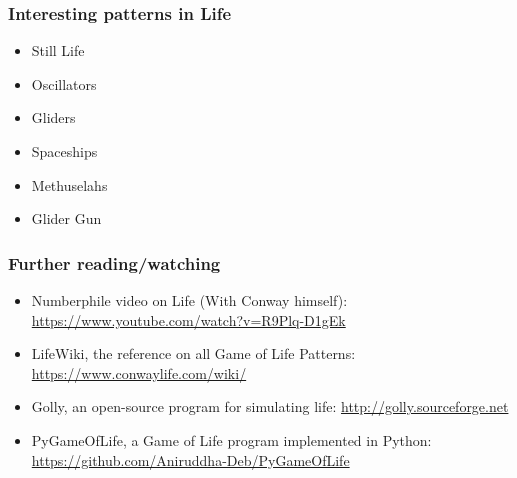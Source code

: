 \documentclass{beamer}
\begin{document}
\begin{frame}
\frametitle{Interesting patterns in Life}
\begin{itemize}
\pause
\item{Still Life}
\pause
\item{Oscillators}
\pause
\item{Gliders}
\pause
\item{Spaceships}
\pause
\item{Methuselahs}
\pause
\item{Glider Gun}
\end{itemize}
\end{frame}

\begin{frame}
\frametitle{Further reading/watching}
\begin{itemize}
\item{Numberphile video on Life (With Conway himself): \url{https://www.youtube.com/watch?v=R9Plq-D1gEk}}
\item{LifeWiki, the reference on all Game of Life Patterns: \url{https://www.conwaylife.com/wiki/}}
\item{Golly, an open-source program for simulating life: \url{http://golly.sourceforge.net}}
\item{PyGameOfLife, a Game of Life program implemented in Python: \url{https://github.com/Aniruddha-Deb/PyGameOfLife}}
\end{itemize}
\end{frame}
\end{document}
